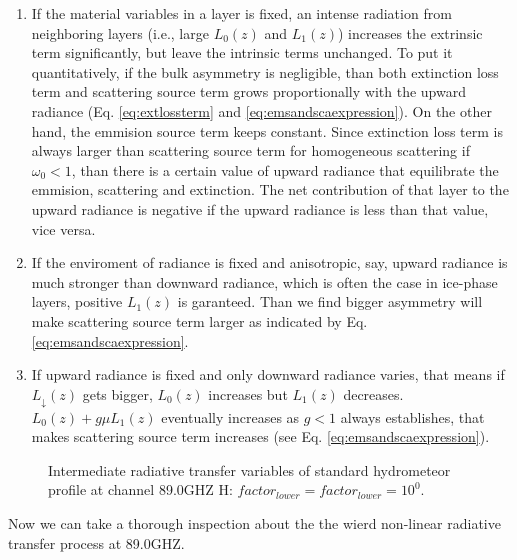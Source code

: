 \begin{enumerate}
    \item {} If the material variables in a layer is fixed, an intense radiation from neighboring layers (i.e., large $L_{0}(z)$ and $L_{1}(z)$)
increases the extrinsic term significantly, but leave the intrinsic terms unchanged. To put it quantitatively, if the bulk asymmetry is negligible,
than both extinction loss term and scattering source term grows proportionally with the upward radiance (Eq. \ref{eq:extlossterm} and \ref{eq:emsandscaexpression}).
On the other hand, the emmision source term keeps constant. Since extinction loss term is always larger than scattering source term for homogeneous scattering if $\omega_{0} < 1$,
than there is a certain value of upward radiance that equilibrate the emmision, scattering and extinction. The net contribution of that layer to the upward radiance
is negative if the upward radiance is less than that value, vice versa.  
    \item {} If the enviroment of radiance is fixed and anisotropic, say, upward radiance is much stronger than downward radiance,
    which is often the case in ice-phase layers, positive $L_{1}(z)$ is garanteed. Than we find bigger asymmetry will make 
    scattering source term larger as indicated by Eq. \ref{eq:emsandscaexpression}.
    \item {} If upward radiance is fixed and only downward radiance varies, that means if $L_{\downarrow}(z)$ gets bigger, $L_{0}(z)$
    increases but $L_{1}(z)$ decreases. $L_{0}(z) + g\mu L_{1}(z)$ eventually increases as $g < 1$ always establishes, that makes scattering
    source term increases (see Eq. \ref{eq:emsandscaexpression}).  
\end{enumerate}

\begin{figure}[hbtp] 
\centering
{}
\caption{Intermediate radiative transfer variables of standard hydrometeor profile at channel 89.0GHZ H: $factor_{lower} = factor_{lower} = 10^{0}$.}
\label{fig:MWRI5zi33}
\end{figure}

Now we can take a thorough inspection about the the wierd non-linear radiative transfer process at 89.0GHZ.

